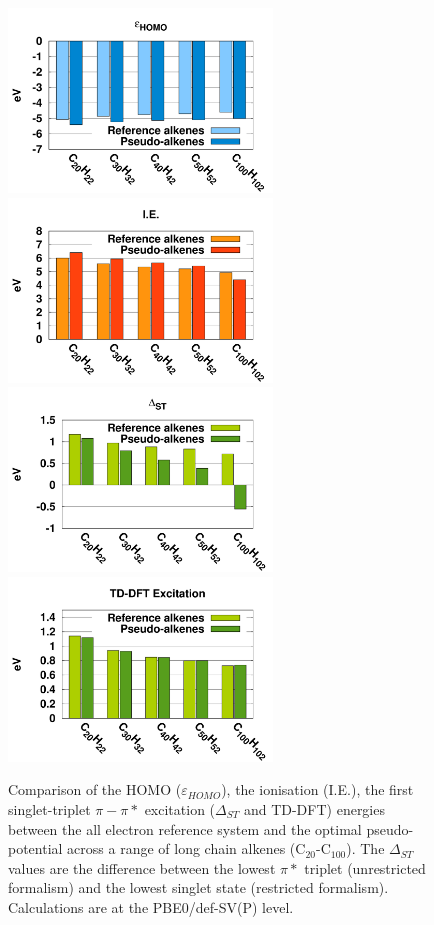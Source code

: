 \documentclass[aip]{revtex4-1}
\begin{document}
\begin{figure}
\begin{center}
\includegraphics[width=7cm]{long_pbe0_homo}
\includegraphics[width=7cm]{long_pbe0_ie}
\includegraphics[width=7cm]{long_pbe0_st}
\includegraphics[width=7cm]{long_pbe0_tddft}
\end{center}

\caption{Comparison of the HOMO ($\varepsilon_{HOMO}$),
the ionisation (I.E.),
the first singlet-triplet $\pi-\pi*$ excitation ($\Delta_{ST}$ and TD-DFT) energies
between the
all electron reference system and the optimal pseudo-potential across a range of long chain alkenes (C\(_{20}\)-C\(_{100}\)).
The $\Delta_{ST}$ values are the difference
between the lowest $\pi*$  triplet (unrestricted formalism) and the lowest singlet state
(restricted formalism).
Calculations are at the PBE0/def-SV(P) level.}
\label{fig:long_chain_graphs}
\end{figure}
\end{document}

